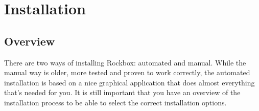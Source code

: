 \chapter{Installation}\label{sec:installation}


\section{Overview}
There are two ways of installing Rockbox: automated and manual. While the
manual way is older, more tested and proven to work correctly, the
automated installation is based on a nice graphical application that does
almost everything that's needed for you. It is still important that you have
an overview of the installation process to be able to select the correct
installation options.

